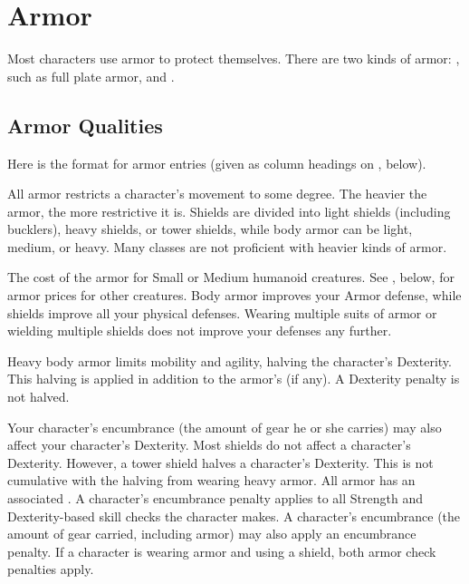 \section{Armor}\label{Armor}

    Most characters use armor to protect themselves. There are two kinds of armor: , such as full plate armor, and .

    \subsection{Armor Qualities}
        \par Here is the format for armor entries (given as column headings on , below).

         All armor restricts a character's movement to some degree. The heavier the armor, the more restrictive it is. Shields are divided into light shields (including bucklers), heavy shields, or tower shields, while body armor can be light, medium, or heavy. Many classes are not proficient with heavier kinds of armor.

         The cost of the armor for Small or Medium humanoid
        creatures. See , below, for armor prices for other creatures.
         Body armor improves your Armor defense, while shields improve all your physical defenses. Wearing multiple suits of armor or wielding multiple shields does not improve your defenses any further.

         Heavy body armor limits mobility and agility, halving the character's Dexterity. This halving is applied in addition to the armor's  (if any). A Dexterity penalty is not halved.

        Your character's encumbrance (the amount of gear he or she carries) may also affect your character's Dexterity.
         Most shields do not affect a character's Dexterity. However, a tower shield halves a character's Dexterity. This is not cumulative with the halving from wearing heavy armor.
         All armor has an associated .
        A character's encumbrance penalty applies to all Strength and Dexterity-based skill checks the character makes.
        A character's encumbrance (the amount of gear carried, including armor) may also apply an encumbrance penalty.
         If a character is wearing armor and using a shield, both armor check penalties apply.

